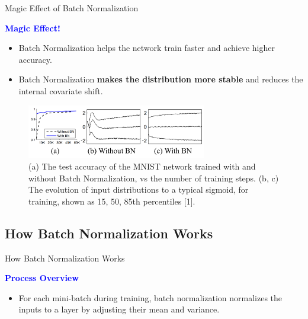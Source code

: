 \documentclass[serif, aspectratio=169]{beamer}
\begin{document}
\begin{frame}{Magic Effect of Batch Normalization}

    \textcolor{blue}{\textbf{Magic Effect!}}
    
    \begin{itemize}
            \item Batch Normalization helps the network train faster and achieve higher accuracy.
            \item Batch Normalization \textbf{makes the distribution more stable} and reduces the internal covariate shift.
    \end{itemize}

    \begin{figure}
        \includegraphics[width=0.7\textwidth]{pic/BN.png}
        \caption{(a) The test accuracy of the MNIST network trained with and without Batch Normalization, vs the number of training steps. (b, c) The evolution of input distributions to a typical sigmoid, for training, shown as {15, 50, 85}th percentiles [1].}
        \label{fig:BN_Effect}
    \end{figure}
\end{frame}


\subsection{How Batch Normalization Works}

\begin{frame}{How Batch Normalization Works}

    \textcolor{blue}{\textbf{Process Overview}}
    
    \begin{itemize}

        \item  For each mini-batch during training, batch normalization normalizes the inputs to a layer by adjusting their mean and variance.

    \end{itemize}
\end{frame}
\end{document}
